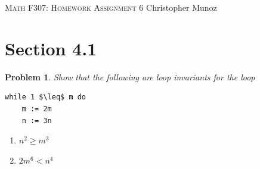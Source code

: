 \documentclass[12pt]{article}
\newtheorem{problem}{Problem}
\begin{document}
\small
\noindent \textsc{Math F307: Homework Assignment 6} \hfill Christopher Munoz

\normalsize
\bigskip

\section*{Section 4.1}
\setcounter{problem}{9}
\begin{problem}
Show that the following are loop invariants for the loop
\begin{lstlisting}[mathescape=true]
while 1 $\leq$ m do
    m := 2m
    n := 3n
\end{lstlisting}

\begin{enumerate}[label=(\alph*)]
    \item $n^2 \geq m^3$
    
    \item $2m^6 < n^4$
\end{enumerate}
\end{problem}
\end{document}
